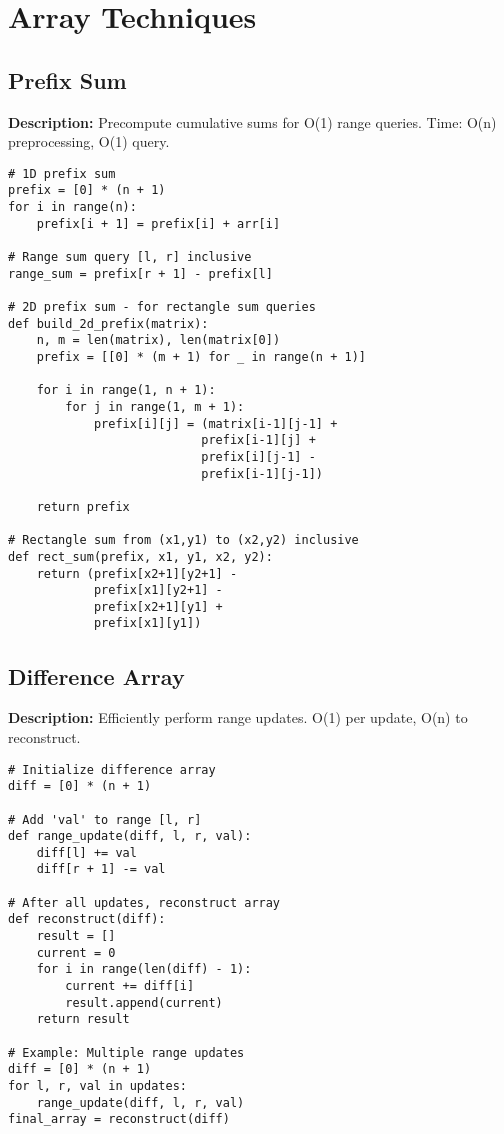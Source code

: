 \section{Array Techniques}

\subsection{Prefix Sum}
\textbf{Description:} Precompute cumulative sums for O(1) range queries. Time: O(n) preprocessing, O(1) query.

\begin{lstlisting}
# 1D prefix sum
prefix = [0] * (n + 1)
for i in range(n):
    prefix[i + 1] = prefix[i] + arr[i]

# Range sum query [l, r] inclusive
range_sum = prefix[r + 1] - prefix[l]

# 2D prefix sum - for rectangle sum queries
def build_2d_prefix(matrix):
    n, m = len(matrix), len(matrix[0])
    prefix = [[0] * (m + 1) for _ in range(n + 1)]
    
    for i in range(1, n + 1):
        for j in range(1, m + 1):
            prefix[i][j] = (matrix[i-1][j-1] + 
                           prefix[i-1][j] + 
                           prefix[i][j-1] - 
                           prefix[i-1][j-1])
    
    return prefix

# Rectangle sum from (x1,y1) to (x2,y2) inclusive
def rect_sum(prefix, x1, y1, x2, y2):
    return (prefix[x2+1][y2+1] - 
            prefix[x1][y2+1] - 
            prefix[x2+1][y1] + 
            prefix[x1][y1])
\end{lstlisting}

\subsection{Difference Array}
\textbf{Description:} Efficiently perform range updates. O(1) per update, O(n) to reconstruct.

\begin{lstlisting}
# Initialize difference array
diff = [0] * (n + 1)

# Add 'val' to range [l, r]
def range_update(diff, l, r, val):
    diff[l] += val
    diff[r + 1] -= val

# After all updates, reconstruct array
def reconstruct(diff):
    result = []
    current = 0
    for i in range(len(diff) - 1):
        current += diff[i]
        result.append(current)
    return result

# Example: Multiple range updates
diff = [0] * (n + 1)
for l, r, val in updates:
    range_update(diff, l, r, val)
final_array = reconstruct(diff)
\end{lstlisting}

